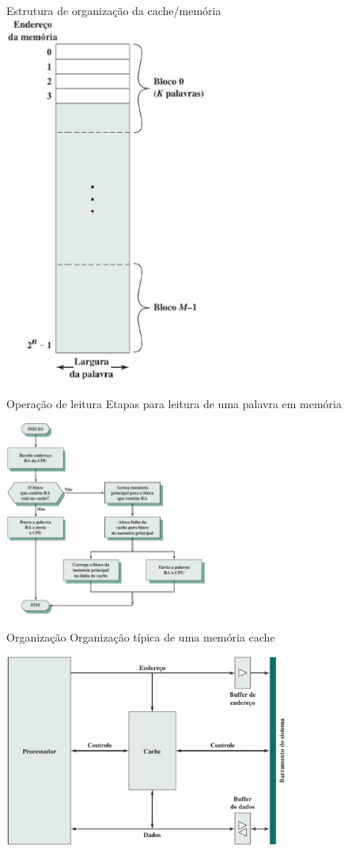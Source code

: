 \begin{slide}{Estrutura de organização da cache/memória}
{			\includegraphics[width=0.50\textwidth]{figs/estrutura-memoria-principal}
	}
\end{slide}

\begin{slide}{Operação de leitura}
	Etapas para leitura de uma palavra em memória
	\begin{center}
		\includegraphics[width=0.50\textwidth]{figs/leitura-cache}
	\end{center}
\end{slide}

\begin{slide}{Organização}
	Organização típica de uma memória cache
	\begin{center}
		\includegraphics[width=0.70\textwidth]{figs/organizacao-tipica-cache}
	\end{center}
\end{slide}

